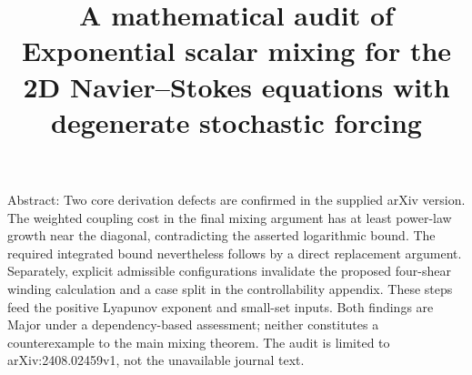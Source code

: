 \documentclass[10pt]{article}
\title{A mathematical audit of
Exponential scalar mixing for the 2D Navier–Stokes equations with degenerate stochastic forcing}
\author{}
\date{}
\begin{document}
\maketitle
Abstract: Two core derivation defects are confirmed in the supplied arXiv version. The weighted coupling cost in the final mixing argument has at least power-law growth near the diagonal, contradicting the asserted logarithmic bound. The required integrated bound nevertheless follows by a direct replacement argument. Separately, explicit admissible configurations invalidate the proposed four-shear winding calculation and a case split in the controllability appendix. These steps feed the positive Lyapunov exponent and small-set inputs. Both findings are Major under a dependency-based assessment; neither constitutes a counterexample to the main mixing theorem. The audit is limited to arXiv:2408.02459v1, not the unavailable journal text.\par
\end{document}
